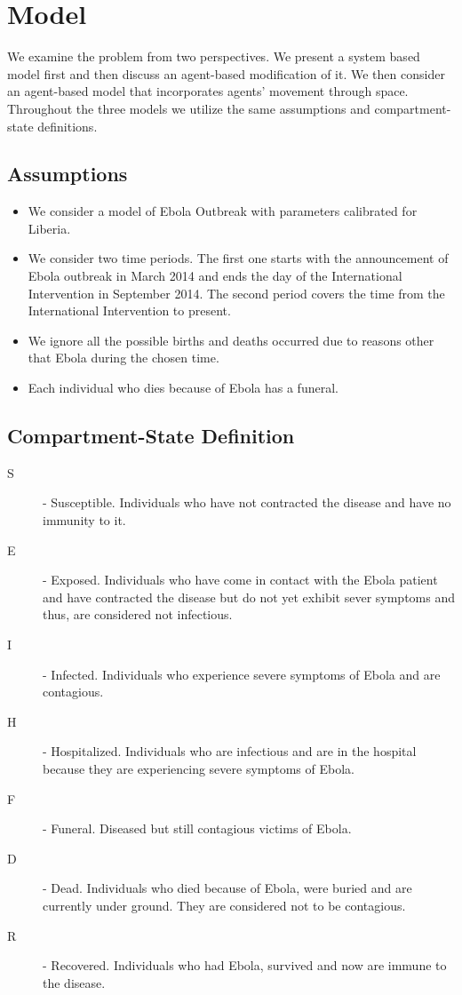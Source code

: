 \documentclass[10pt]{article}
\begin{document}
\section{Model}\label{sec:Model}
%
%
%
We examine the problem from two perspectives. We present a system based model first and then discuss an agent-based modification of it. We then consider an agent-based model that incorporates agents' movement through space. Throughout the three models we utilize the same assumptions and compartment-state definitions. 
%
%
\subsection{Assumptions}
\begin{itemize}
\item We consider a model of Ebola Outbreak with parameters calibrated for Liberia.
\item We consider two time periods. The first one starts with the announcement of Ebola outbreak in March 2014 and ends the day of the International Intervention in September 2014. The second period covers the time from the International Intervention to present.
\item We ignore all the possible births and deaths occurred due to reasons other that Ebola during the chosen time. 
\item Each individual who dies because of Ebola has a funeral.
\end{itemize}
\subsection{Compartment-State Definition}
\begin{description}
\item[S]- Susceptible. Individuals who have not contracted the disease and have no immunity to it. 
\item [E] - Exposed. Individuals who have come in contact with the Ebola patient and have contracted the disease but do not yet exhibit sever symptoms and thus, are considered not infectious.
\item [I] - Infected. Individuals who experience severe symptoms of Ebola and are contagious.
\item [H] - Hospitalized. Individuals who are infectious and are in the hospital because they are experiencing severe symptoms of Ebola.
\item[F] - Funeral. Diseased but still contagious victims of Ebola. 
\item[D] - Dead. Individuals who died because of Ebola, were buried and are currently under ground. They are considered not to be contagious.
\item [R] - Recovered. Individuals who had Ebola, survived and now are immune to the disease.
\end{description}
%
%
\end{document}
